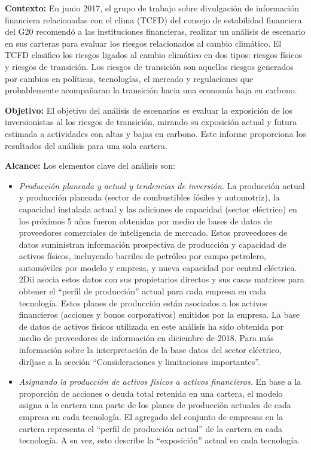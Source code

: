 \documentclass[10pt,table]{article}\usepackage[]{graphicx}\usepackage[]{color}
\begin{document}
	\begin{multicols}{2}
		\textbf{Contexto:} En junio 2017, el grupo de trabajo sobre divulgación de información financiera relacionadas con el clima (TCFD) del consejo de estabilidad financiera del G20 recomendó a las instituciones financieras, realizar un análisis de escenario en sus carteras para evaluar los riesgos relacionados al cambio climático. El TCFD clasifico los riesgos ligados al cambio climático en dos tipos: riesgos físicos y riesgos de transición. Los riesgos de transición son aquellos riesgos generados por cambios en políticas, tecnologías, el mercado y regulaciones que probablemente acompañaran la transición hacia una economía baja en carbono. 
		
		
		\textbf{Objetivo:} El objetivo del análisis de escenarios es evaluar la exposición de los inversionistas al los riesgos de transición, mirando su exposición actual y futura estimada a actividades con altas y bajas en carbono. Este informe proporciona los resultados del análisis para una sola cartera.
		
		\textbf{Alcance:} Los elementos clave del análisis son:
		
		\begin{itemize}
			\item{\textit{Producción planeada y actual y tendencias de inversión.} La producción actual y producción planeada (sector de combustibles fósiles y automotriz), la capacidad instalada actual y las adiciones de capacidad (sector eléctrico) en los próximos 5 años fueron obtenidas por medio de bases de datos de proveedores comerciales de inteligencia de mercado. Estos proveedores de datos suministran información prospectiva de producción y capacidad de activos físicos, incluyendo barriles de petróleo por campo petrolero, automóviles por modelo y empresa, y nueva capacidad por central eléctrica. 2Dii asocia estos datos con sus propietarios directos y sus casas matrices para obtener el “perfil de producción” actual para cada empresa en cada tecnología. Estos planes de producción están asociados a los activos financieros (acciones y bonos corporativos) emitidos por la empresa. La base de datos de activos físicos utilizada en este análisis ha sido obtenida por medio de proveedores de información en diciembre de 2018. Para más información sobre la interpretación de la base datos del sector eléctrico, diríjase a la sección “Consideraciones y limitaciones importantes”.}
			
			\item{\textit{Asignando la producción de activos físicos a activos financieros.} En base a la proporción de acciones o deuda total retenida en una cartera, el modelo asigna a la cartera una parte de los planes de producción actuales de cada empresa en cada tecnología. El agregado del conjunto de empresas en la cartera representa el “perfil de producción actual” de la cartera en cada tecnología. A su vez, esto describe la “exposición” actual en cada tecnología.}
			

\end{itemize}
\end{multicols}
\end{document}
